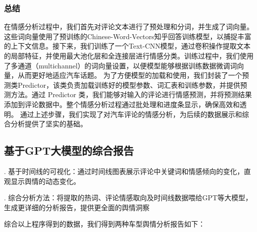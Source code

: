\documentclass[UTF8,a4paper,15pt,titlepage,oneside]{ctexbook}
\begin{document}
\subsubsection{总结}

在情感分析过程中，我们首先对评论文本进行了预处理和分词，并生成了词向量。这些词向量使用了预训练的Chinese-Word-Vectors知乎回答训练模型，以捕捉丰富的上下文信息。接下来，我们训练了一个Text-CNN模型，通过卷积操作提取文本的局部特征，并使用最大池化层和全连接层进行情感分类。训练过程中，我们使用了多通道（multichannel）的词向量设置，以便模型能够根据训练数据微调词向量，从而更好地适应汽车话题。
为了方便模型的加载和使用，我们封装了一个预测类Predictor，该类负责加载训练好的模型参数、词汇表和训练参数，并提供预测方法。通过 Predictor 类，我们能够对输入的评论进行情感预测，并将预测结果添加到评论数据中。整个情感分析过程通过批处理和进度条显示，确保高效和透明。
通过上述步骤，我们实现了对汽车评论的情感分析，为后续的数据展示和综合分析提供了坚实的基础。


\subsection{基于GPT大模型的综合报告}

. 基于时间线的可视化：通过时间线图表展示评论中关键词和情感倾向的变化，直观显示舆情的动态变化。

. 综合分析方法：将提取的热词、评论情感取向及时间线数据喂给GPT等大模型，生成更详细的分析报告，提供更全面的舆情洞察

综合以上程序得到的数据，我们得到两种车型舆情分析报告如下：
\end{document}
